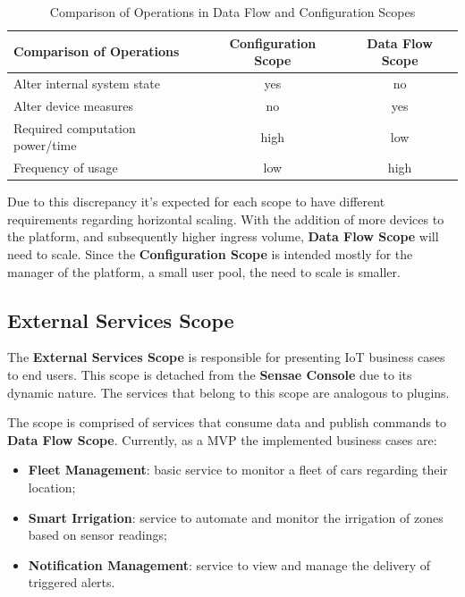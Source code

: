 \begin{table}[H]
   \caption[Comparison of Operations in Data Flow and Configuration Scopes]{Comparison of Operations in Data Flow and Configuration Scopes}
   \label{tab:design:system_scopes:data_flow_scope:comparison}
   \centering
   \begin{tabular}{@{}lcc@{}}
   \toprule
   \textbf{Comparison of Operations} & \textbf{Configuration Scope} & \textbf{Data Flow Scope} \\ \midrule
       Alter internal system state & yes & no \\ \hline
       Alter device measures & no & yes \\ \hline
       Required computation power/time & high & low \\ \hline
       Frequency of usage & low & high \\ \hline
   \end{tabular}
\end{table}

Due to this discrepancy it's expected for each scope to have different requirements regarding horizontal scaling. With the addition of more devices to the platform, and subsequently higher ingress volume, \textbf{Data Flow Scope} will need to scale. Since the \textbf{Configuration Scope} is intended mostly for the manager of the platform, a small user pool, the need to scale is smaller.

\subsection{External Services Scope}
\label{subsec:design:system_scopes:service_scope}

The \textbf{External Services Scope} is responsible for presenting \gls{IoT} business cases to end users. This scope is detached from the \textbf{Sensae Console} due to its dynamic nature. The services that belong to this scope are analogous to plugins.

The scope is comprised of services that consume data and publish commands to \textbf{Data Flow Scope}. Currently, as a \gls{MVP} the implemented business cases are:

\begin{itemize}
   \item \textbf{Fleet Management}: basic service to monitor a fleet of cars regarding their location;
   \item \textbf{Smart Irrigation}: service to automate and monitor the irrigation of zones based on sensor readings;
   \item \textbf{Notification Management}: service to view and manage the delivery of triggered alerts.
\end{itemize}

